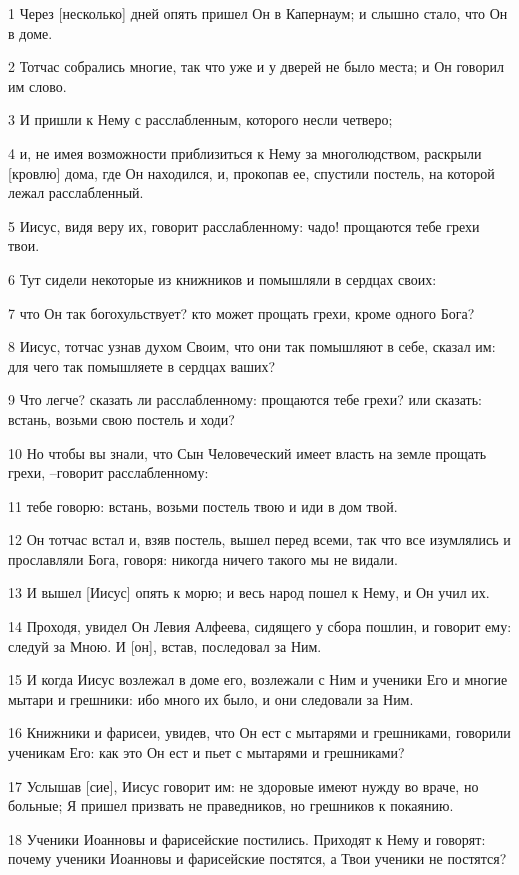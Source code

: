 \par 1 Через [несколько] дней опять пришел Он в Капернаум; и слышно стало, что Он в доме.
\par 2 Тотчас собрались многие, так что уже и у дверей не было места; и Он говорил им слово.
\par 3 И пришли к Нему с расслабленным, которого несли четверо;
\par 4 и, не имея возможности приблизиться к Нему за многолюдством, раскрыли [кровлю] дома, где Он находился, и, прокопав ее, спустили постель, на которой лежал расслабленный.
\par 5 Иисус, видя веру их, говорит расслабленному: чадо! прощаются тебе грехи твои.
\par 6 Тут сидели некоторые из книжников и помышляли в сердцах своих:
\par 7 что Он так богохульствует? кто может прощать грехи, кроме одного Бога?
\par 8 Иисус, тотчас узнав духом Своим, что они так помышляют в себе, сказал им: для чего так помышляете в сердцах ваших?
\par 9 Что легче? сказать ли расслабленному: прощаются тебе грехи? или сказать: встань, возьми свою постель и ходи?
\par 10 Но чтобы вы знали, что Сын Человеческий имеет власть на земле прощать грехи, --говорит расслабленному:
\par 11 тебе говорю: встань, возьми постель твою и иди в дом твой.
\par 12 Он тотчас встал и, взяв постель, вышел перед всеми, так что все изумлялись и прославляли Бога, говоря: никогда ничего такого мы не видали.
\par 13 И вышел [Иисус] опять к морю; и весь народ пошел к Нему, и Он учил их.
\par 14 Проходя, увидел Он Левия Алфеева, сидящего у сбора пошлин, и говорит ему: следуй за Мною. И [он], встав, последовал за Ним.
\par 15 И когда Иисус возлежал в доме его, возлежали с Ним и ученики Его и многие мытари и грешники: ибо много их было, и они следовали за Ним.
\par 16 Книжники и фарисеи, увидев, что Он ест с мытарями и грешниками, говорили ученикам Его: как это Он ест и пьет с мытарями и грешниками?
\par 17 Услышав [сие], Иисус говорит им: не здоровые имеют нужду во враче, но больные; Я пришел призвать не праведников, но грешников к покаянию.
\par 18 Ученики Иоанновы и фарисейские постились. Приходят к Нему и говорят: почему ученики Иоанновы и фарисейские постятся, а Твои ученики не постятся?
